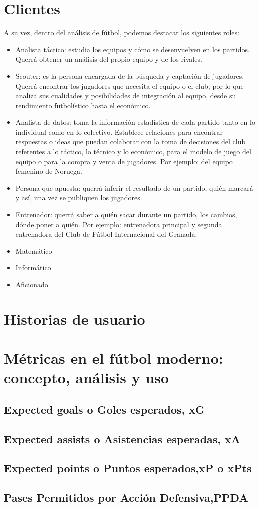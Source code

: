 \section{Clientes}
A su vez, dentro del análisis de fútbol, podemos destacar los siguientes roles:

\begin{itemize}
    \item Analista táctico: estudia los equipos y cómo se desenvuelven en los partidos. 
    Querrá obtener un análisis del propio equipo y de los rivales.
    \item Scouter: es la persona encargada de la búsqueda y captación 
    de jugadores. Querrá encontrar los jugadores que necesita el equipo 
    o el club, por lo que analiza sus cualidades y posibilidades de 
    integración al equipo, desde su rendimiento futbolístico hasta el 
    económico.
    \item Analista de datos: toma la información estadística de 
    cada partido tanto en lo individual como en lo colectivo. 
    Establece relaciones para encontrar respuestas o ideas que 
    puedan colaborar con la toma de decisiones del club referentes 
    a lo táctico, lo técnico y lo económico, para el modelo de 
    juego del equipo o para la compra y venta de jugadores. Por ejemplo: del 
    equipo femenino de Noruega. 
    \item Persona que apuesta: querrá inferir el resultado de un partido, 
    quién marcará y así, una vez se publiquen los jugadores. 
    \item Entrenador: querrá saber a quién sacar durante un partido, los 
    cambios, dónde poner a quién. Por ejemplo: entrenadora principal y 
    segunda entrenadora del Club de Fútbol Internacional del Granada.
    \item Matemático 
    \item Informático 
    \item Aficionado  
\end{itemize}


\section{Historias de usuario}  



\section{Métricas en el fútbol moderno: concepto, análisis y uso}

\subsection{Expected goals o Goles esperados, xG}


\subsection{Expected assists o Asistencias esperadas, xA}


\subsection{Expected points o Puntos esperados,xP o xPts}


\subsection{Pases Permitidos por Acción Defensiva,PPDA}



